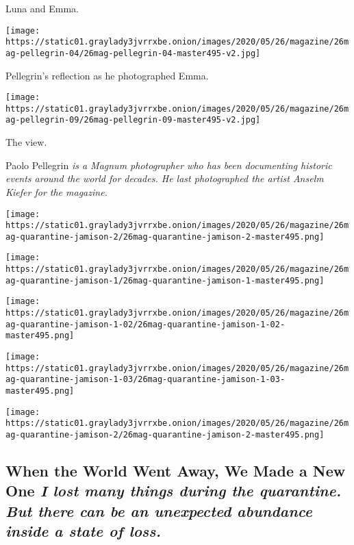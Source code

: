 Luna and Emma.

\texttt{[image: https://static01.graylady3jvrrxbe.onion/images/2020/05/26/magazine/26mag-pellegrin-04/26mag-pellegrin-04-master495-v2.jpg]}

Pellegrin's reflection as he photographed Emma.

\texttt{[image: https://static01.graylady3jvrrxbe.onion/images/2020/05/26/magazine/26mag-pellegrin-09/26mag-pellegrin-09-master495-v2.jpg]}

The view.

Paolo Pellegrin \emph{is a Magnum photographer who has been documenting
historic events around the world for decades. He last photographed the
artist Anselm Kiefer for the magazine.}

\texttt{[image: https://static01.graylady3jvrrxbe.onion/images/2020/05/26/magazine/26mag-quarantine-jamison-2/26mag-quarantine-jamison-2-master495.png]}

\texttt{[image: https://static01.graylady3jvrrxbe.onion/images/2020/05/26/magazine/26mag-quarantine-jamison-1/26mag-quarantine-jamison-1-master495.png]}

\texttt{[image: https://static01.graylady3jvrrxbe.onion/images/2020/05/26/magazine/26mag-quarantine-jamison-1-02/26mag-quarantine-jamison-1-02-master495.png]}

\texttt{[image: https://static01.graylady3jvrrxbe.onion/images/2020/05/26/magazine/26mag-quarantine-jamison-1-03/26mag-quarantine-jamison-1-03-master495.png]}

\texttt{[image: https://static01.graylady3jvrrxbe.onion/images/2020/05/26/magazine/26mag-quarantine-jamison-2/26mag-quarantine-jamison-2-master495.png]}

\hypertarget{when-the-world-went-away-we-made-a-new-one-i-lost-many-things-during-the-quarantine-but-there-can-be-an-unexpected-abundance-inside-a-state-of-loss}{%
\subsection{\texorpdfstring{When the World Went Away, We Made a New One
\emph{I lost many things during the quarantine. But there can be an
unexpected abundance inside a state of
loss.}}{When the World Went Away, We Made a New One I lost many things during the quarantine. But there can be an unexpected abundance inside a state of loss.}}\label{when-the-world-went-away-we-made-a-new-one-i-lost-many-things-during-the-quarantine-but-there-can-be-an-unexpected-abundance-inside-a-state-of-loss}}

